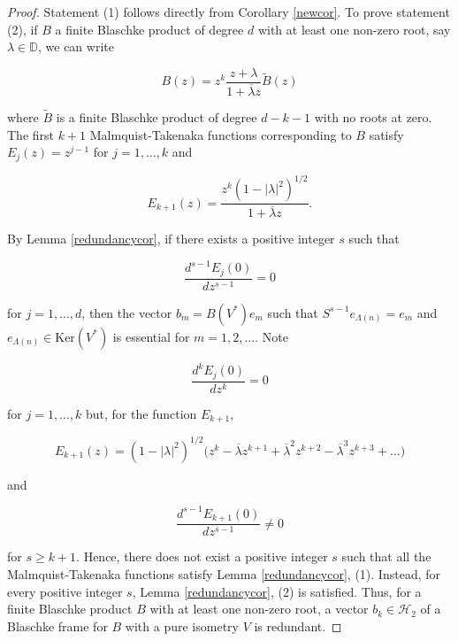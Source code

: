 \documentclass[10pt, reqno]{amsart}
\theoremstyle{definition}
\newtheorem{example}[theorem]{Example}
\numberwithin{equation}{section}
\begin{document}
\begin{proof}
Statement (1) follows directly from Corollary \ref{newcor}. To prove statement (2), if $B$ a finite Blaschke product of degree $d$ with at least one non-zero root, say $\lambda\in\mathbb{D}$, we can write

    $$B(z) = z^{k} \dfrac{z+\lambda}{1+\overline{\lambda}z}\widetilde{B}(z)$$
    
\noindent where $\widetilde{B}$ is a finite Blaschke product of degree $d-k-1$ with no roots at zero. The first $k+1$ Malmquist-Takenaka functions corresponding to $B$ satisfy $E_{j}(z)=z^{j-1}$ for $j=1,\hdots,k$ and 

$$E_{k+1}(z)=\dfrac{z^{k}(1-\lvert \lambda\rvert^{2})^{1/2}}{1+\overline{\lambda}z}.$$

\noindent By Lemma \ref{redundancycor}, if there exists a positive integer $s$ such that

$$\dfrac{d^{s-1}E_{j}(0)}{dz^{s-1}} = 0$$

\noindent for $j=1,\hdots,d$, then the vector $b_{m}=B(V^{*})e_{m}$ such that $S^{s-1}e_{\Lambda(n)}=e_{m}$ and $e_{\Lambda(n)}\in\mathrm{Ker}(V^{*})$ is essential for $m=1,2,\hdots$. Note

$$\dfrac{d^{k}E_{j}(0)}{dz^{k}}=0$$ 

\noindent for $j=1,\hdots,k$ but, for the function $E_{k+1}$,

$$E_{k+1}(z)=(1-\lvert \lambda\rvert^{2})^{1/2}\big(z^{k}-\overline{\lambda}z^{k+1}+\overline{\lambda}^{2}z^{k+2}-\overline{\lambda}^{3}z^{k+3}+\hdots\big)$$

\noindent and

$$\dfrac{d^{s-1}E_{k+1}(0)}{dz^{s-1}}\neq 0$$

\noindent for $s\geq k+1$. Hence, there does not exist a positive integer $s$ such that all the Malmquist-Takenaka functions satisfy Lemma \ref{redundancycor}, (1). Instead, for every positive integer $s$, Lemma \ref{redundancycor}, (2) is satisfied. Thus, for a finite Blaschke product $B$ with at least one non-zero root, a vector $b_{k}\in\mathcal{H}_{2}$ of a Blaschke frame for $B$ with a pure isometry $V$ is redundant. \end{proof}


    
    
\end{document}

